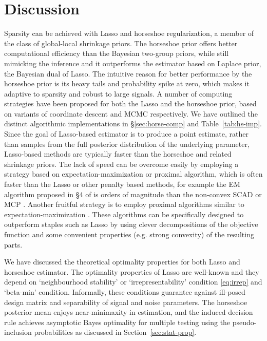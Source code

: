 \documentclass[sts,preprint]{imsart}
\begin{document}
\section{Discussion}\label{sec:9}

Sparsity can be achieved with Lasso and horseshoe regularization, a member of the class of global-local shrinkage priors. The horseshoe prior offers better computational efficiency than the Bayesian two-group priors, while still mimicking the inference and it outperforms the estimator based on Laplace prior, the Bayesian dual of Lasso. The intuitive reason for better performance by the horseshoe prior is its heavy
tails and probability spike at zero, which makes it adaptive to sparsity and robust to large signals.  A number of computing strategies have been proposed for both the Lasso and the horseshoe prior, based on variants of coordinate descent and MCMC respectively.  We have outlined the distinct algorithmic implementations in \S \ref{sec:horse-comp} and Table~\ref{tab:hs-imp}. Since the goal of Lasso-based estimator is to produce a point estimate, rather than samples from the full posterior distribution of the underlying parameter, Lasso-based methods are typically faster than the horseshoe and related shrinkage priors.
The lack of speed can be overcome easily by employing a strategy based on expectation-maximization or proximal algorithm, which is often faster than the Lasso or other penalty based methods, for example the EM algorithm proposed in \S 4 of \citet{bhadra2017horseshoe} is orders of magnitude than the non-convex SCAD or MCP \citep[\textit{vide} Table 1]{bhadra2017horseshoe}. Another fruitful strategy is to employ proximal algorithms similar to expectation-maximization \citep{polson2015proximal}. These algorithms can be specifically designed to outperform staples such as Lasso \citep{bhadra2017horseshoe} by using clever decompositions of the objective function and some convenient properties (e.g. strong convexity) of the resulting parts.

We have discussed the theoretical optimality properties for both Lasso and horseshoe estimator. The optimality properties of Lasso are well-known and they depend on `neighbourhood stability' or `irrepresentability' condition \eqref{eq:irrep} and `beta-min' condition. Informally, these conditions guarantee against ill-posed design matrix and separability of signal and noise parameters. The horseshoe posterior mean enjoys near-minimaxity in estimation, and the induced decision rule achieves asymptotic Bayes optimality for multiple testing using the pseudo-inclusion probabilities as discussed in Section~\ref{sec:stat-prop}. 
\end{document}
